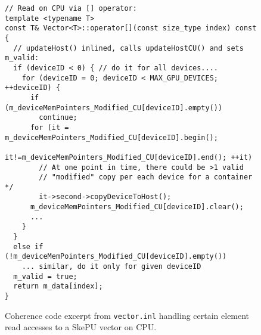\begin{figure}
\begin{small}
\begin{verbatim}
// Read on CPU via [] operator:
template <typename T>
const T& Vector<T>::operator[](const size_type index) const
{
  // updateHost() inlined, calls updateHostCU() and sets m_valid:
  if (deviceID < 0) { // do it for all devices....
    for (deviceID = 0; deviceID < MAX_GPU_DEVICES; ++deviceID) {
      if (m_deviceMemPointers_Modified_CU[deviceID].empty())
        continue;
      for (it = m_deviceMemPointers_Modified_CU[deviceID].begin();
           it!=m_deviceMemPointers_Modified_CU[deviceID].end(); ++it)
        // At one point in time, there could be >1 valid
        // "modified" copy per each device for a container */
        it->second->copyDeviceToHost();
      m_deviceMemPointers_Modified_CU[deviceID].clear();
      ...
    }
  }
  else if (!m_deviceMemPointers_Modified_CU[deviceID].empty()) 
    ... similar, do it only for given deviceID
  m_valid = true;
  return m_data[index];
}
\end{verbatim}
\end{small}

\vspace*{-3mm}
\caption{\label{fig:skepucoherence2b}Coherence code excerpt from \texttt{vector.inl}
          handling certain element read accesses to a SkePU vector on CPU.}
\end{figure}
  
